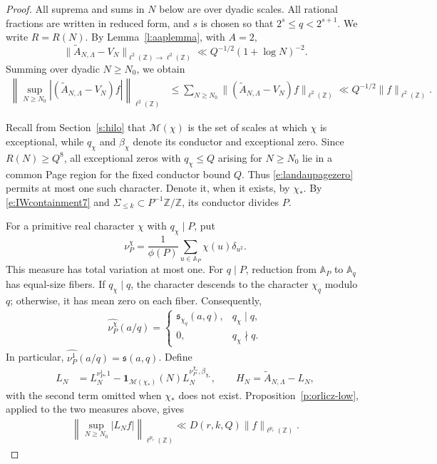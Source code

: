 \documentclass[12pt,reqno]{amsart}
\numberwithin{equation}{section}
\theoremstyle{definition}
\theoremstyle{remark}
\begin{document}
\begin{proof}
All suprema and sums in \(N\) below are over dyadic scales.
All rational fractions are written in reduced form, and
\(s\) is chosen so that \(2^s\leq q<2^{s+1}\).
We write \(R=R(N)\).
By Lemma~\ref{l:aaplemma}, with \(A=2\),
\[
 \|\widetilde A_{N,\Lambda}-V_N\|
 _{\ell^2(\mathbb Z)\to\ell^2(\mathbb Z)}
 \ll Q^{-1/2}(1+\log N)^{-2}.
\]
Summing over dyadic \(N\geq N_0\), we obtain
\begin{align}\label{e:orlicz-circle-error}
 \left\|
 \sup_{N\geq N_0}
 |(\widetilde A_{N,\Lambda}-V_N)f|
 \right\|_{\ell^2(\mathbb Z)}
 &\leq
 \sum_{N\geq N_0}
 \|(\widetilde A_{N,\Lambda}-V_N)f\|_{\ell^2(\mathbb Z)}
\ll Q^{-1/2}\|f\|_{\ell^2(\mathbb Z)}.
\end{align}

Recall from Section~\ref{s:hilo} that \(\mathcal M(\chi)\) is the
set of scales at which \(\chi\) is exceptional, while \(q_\chi\)
and \(\beta_\chi\) denote its conductor and exceptional zero.
Since \(R(N)\geq Q^8\), all exceptional zeros with \(q_\chi\leq Q\)
arising for \(N\geq N_0\) lie in a common Page region for the fixed
conductor bound \(Q\). Thus \eqref{e:landaupagezero} permits at most
one such character. Denote it, when it exists, by \(\chi_*\).
By \eqref{e:IWcontainment7} and
\(\Sigma_{\leq k}\subset P^{-1}\mathbb Z/\mathbb Z\), its conductor
divides \(P\).

For a primitive real character \(\chi\) with \(q_\chi\mid P\), put
\[
 \nu_P^\chi
 =
 \frac1{\phi(P)}
 \sum_{u\in\mathbb A_P}\chi(u)\delta_{u^2}.
\]
This measure has total variation at most one.
For \(q\mid P\), reduction from \(\mathbb A_P\) to
\(\mathbb A_q\) has equal-size fibers. If \(q_\chi\mid q\), the
character descends to the character \(\chi_q\) modulo \(q\);
otherwise, it has mean zero on each fiber. Consequently,
\begin{align}\label{e:orlicz-character-coefficient}
 \widehat{\nu_P^\chi}(a/q)
 =
 \begin{cases}
  \mathfrak s_{\chi_q}(a,q),&q_\chi\mid q,\\
  0,&q_\chi\nmid q.
 \end{cases}
\end{align}
In particular,
\(\widehat{\nu_P^1}(a/q)=\mathfrak s(a,q)\).
Define
\begin{align}\label{e:orlicz-LNdef}
 L_N
 &=
 L_N^{\nu_P^1,1}
 -
 \mathbf1_{\mathcal M(\chi_*)}(N)
 L_N^{\nu_P^{\chi_*},\beta_{\chi_*}},
 \qquad
 H_N=\widetilde A_{N,\Lambda}-L_N,
\end{align}
with the second term omitted when \(\chi_*\) does not exist.
Proposition~\ref{p:orlicz-low}, applied to the two measures above,
gives
\begin{align}\label{e:orlicz-low-prime}
 \left\|\sup_{N\geq N_0}|L_Nf|\right\|_{\ell^{p_r}(\mathbb Z)}
 \ll
 D(r,k,Q)\|f\|_{\ell^{p_r}(\mathbb Z)}.
\end{align}


\end{proof}
\end{document}
